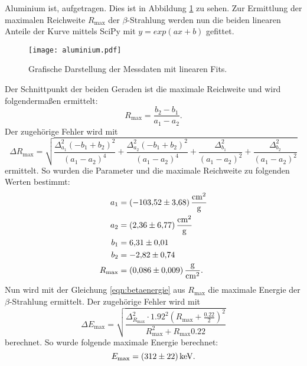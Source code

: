  Aluminium ist, aufgetragen. Dies ist in Abbildung \ref{fig:beta} zu sehen. Zur Ermittlung der maximalen Reichweite $R_\text{max}$ der $\beta$-Strahlung werden nun die beiden linearen
 Anteile der Kurve mittels SciPy mit $y=exp(ax+b)$ gefittet.
 \begin{figure}
   \centering
   \texttt{[image: aluminium.pdf]}
   \caption{Grafische Darstellung der Messdaten mit linearen Fits.}
   \label{fig:beta}
 \end{figure}
 Der Schnittpunkt der beiden Geraden ist die maximale Reichweite und wird folgendermaßen ermittelt:
 \begin{equation*}
   R_\text{max}= \frac{b_2 - b_1}{a_1 - a_2} .
 \end{equation*}
 Der zugehörige Fehler wird mit
 \begin{equation*}
  \Delta R_\text{max} = \sqrt{\frac{\Delta_{a_{1}}^{2} \left(- b_{1} + b_{2}\right)^{2}}{\left(a_{1} - a_{2}\right)^{4}} + \frac{\Delta_{a_{2}}^{2} \left(- b_{1} + b_{2}\right)^{2}}{\left(a_{1} - a_{2}\right)^{4}} + \frac{\Delta_{b_{1}}^{2}}{\left(a_{1} - a_{2}\right)^{2}} + \frac{\Delta_{b_{2}}^{2}}{\left(a_{1} - a_{2}\right)^{2}}}
 \end{equation*}
ermittelt.
So wurden die Parameter und die maximale Reichweite zu folgenden Werten bestimmt:
\begin{align*}
  a_1 &= \SI{-103.52\pm3.68}{\centi\metre\squared\per\gram} \\
  a_2 &= \SI{2.36\pm6.77}{\centi\metre\squared\per\gram} \\
  b_1 &= \num{6.31\pm0.01} \\
  b_2 &= \num{-2.82\pm0.74} \\
  R_\text{max} &= \SI{0.086\pm0.009}{\gram\per\centi\metre\squared} .
\end{align*}
Nun wird mit der Gleichung \eqref{eqn:betaenergie} aus $R_\text{max}$ die maximale Energie der $\beta$-Strahlung ermittelt.
Der zugehörige Fehler wird mit
\begin{equation*}
  \Delta E_\text{max}= \sqrt{\frac{\Delta_{R_{\text{max}}}^{2} \cdot {1.92}^{2} \left(R_{\text{max}} + \frac{{0.22}}{2}\right)^{2}}{R_{\text{max}}^{2} + R_{\text{max}} {0.22}}}
\end{equation*}
berechnet.
So wurde folgende maximale Energie berechnet:
\begin{equation*}
  E_\text{max} = \SI{312\pm22}{\kilo\electronvolt}.
\end{equation*}
